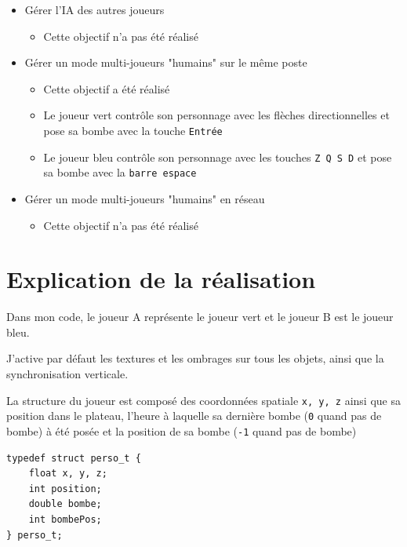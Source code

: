 \documentclass{article}
\begin{document}
\begin{itemize}
        \item Gérer l’IA des autres joueurs
        \begin{itemize}
            \item Cette objectif n'a pas été réalisé
        \end{itemize}

        \item Gérer un mode multi-joueurs "humains" sur le même poste
        \begin{itemize}
            \item Cette objectif a été réalisé
            \item Le joueur vert contrôle son personnage avec les flèches directionnelles et pose sa bombe avec la touche \texttt{Entrée}
            \item Le joueur bleu contrôle son personnage avec les touches \texttt{Z Q S D} et pose sa bombe avec la \texttt{barre espace}
        \end{itemize}

        \item Gérer un mode multi-joueurs "humains" en réseau
        \begin{itemize}
            \item Cette objectif n'a pas été réalisé
        \end{itemize}
    \end{itemize}

    \section[Explication]{Explication de la réalisation}
    Dans mon code, le joueur A représente le joueur vert et le joueur B est le joueur bleu.
    \vspace{10pt}

    J'active par défaut les textures et les ombrages sur tous les objets, ainsi que la synchronisation verticale.
    \vspace{10pt}

    La structure du joueur est composé des coordonnées spatiale \texttt{x, y, z} ainsi que sa position dans le plateau, l'heure à laquelle sa dernière bombe (\texttt{0} quand pas de bombe) à été posée et la position de sa bombe (\texttt{-1} quand pas de bombe)
    \begin{center}\begin{minipage}{0.5\textwidth}
        \begin{verbatim}
typedef struct perso_t {
    float x, y, z;
    int position;
    double bombe;
    int bombePos;
} perso_t;
        \end{verbatim}
    \end{minipage}\end{center}
    \vspace{10pt}
\end{document}
